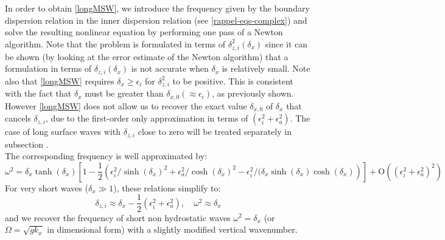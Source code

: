 In order to obtain \ref{longMSW}, we introduce the frequency given by the boundary dispersion relation in the inner dispersion relation (see \ref{rappel-eqs-complex}) and solve the resulting nonlinear equation by performing one pass of a Newton algorithm. Note that the problem is formulated in terms of $\delta_{z,i}^2(\delta_x)$ since it can be shown (by looking at the error estimate of the Newton algorithm) that a formulation in terms of $\delta_{z,i}(\delta_x)$ is not accurate when $\delta_x$ is relatively small.
Note also that \ref{longMSW} requires $\delta_x \ge \epsilon_i$ for $\delta_{z,i}^2$ to be positive. This is consistent with the fact that $\delta_x$ must be greater than $\delta_{x,0} (\approx \epsilon_i)$, as previously shown. However \ref{longMSW} does not allow us to recover the exact value $\delta_{x,0}$ of $\delta_x$ that cancels $\delta_{z,i}$, due to the first-order only approximation in terms of $(\epsilon_i^2+\epsilon_a^2)$. The case of long surface waves with $\delta_{z,i}$ close to zero will be treated separately in  subsection .
\\
The corresponding frequency is well approximated by:
%
\begin{equation}
\omega^2=\delta_x \tanh(\delta_x)
\left[1-\frac{1}{2}\left(
\epsilon_i^2/\sinh(\delta_x)^2+\epsilon_a^2/\cosh(\delta_x)^2-\epsilon_i^2/(\delta_x\sinh(\delta_x)\cosh(\delta_x)
\right)
\right]+\mathrm{O}	((\epsilon_i^2+\epsilon_a^2)^2)
\label{eqomegasurfacewaves}
\end{equation}
%
For very short waves ($\delta_x \gg 1$), these relations simplify to:
\[
\delta_{z,i}\approx \delta_x
-\frac{1}{2}\left(
\epsilon_i^2+\epsilon_a^2
\right)
,\quad
\omega^2\approx \delta_x
\]
and we recover the frequency of short non hydrostatic waves $\omega^2 = \delta_x$ (or $\Omega=\sqrt{gk_x}$ in dimensional form) with a slightly modified vertical wavenumber.
%
%
